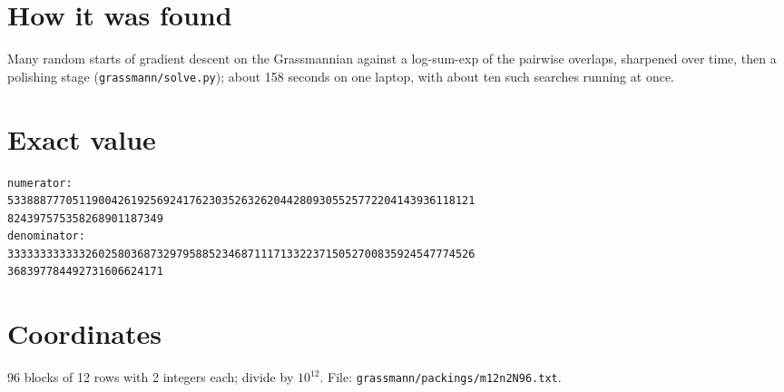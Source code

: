 \documentclass[11pt,a4paper]{article}
\begin{document}
\section{How it was found}
Many random starts of gradient descent on the Grassmannian against a log-sum-exp of the pairwise overlaps, sharpened over time, then a polishing stage (\texttt{grassmann/solve.py}); about 158 seconds on one laptop, with about ten such searches running at once.


\appendix
\section{Exact value}
{\small
\begin{verbatim}
numerator:
533888777051190042619256924176230352632620442809305525772204143936118121
824397575358268901187349
denominator:
333333333333260258036873297958852346871117133223715052700835924547774526
368397784492731606624171
\end{verbatim}}

\section{Coordinates}
96 blocks of 12 rows with 2 integers each; divide by $10^{12}$. File: \texttt{grassmann/packings/m12n2N96.txt}.
{\tiny
\begin{multicols}{4}
\end{multicols}}
\end{document}
